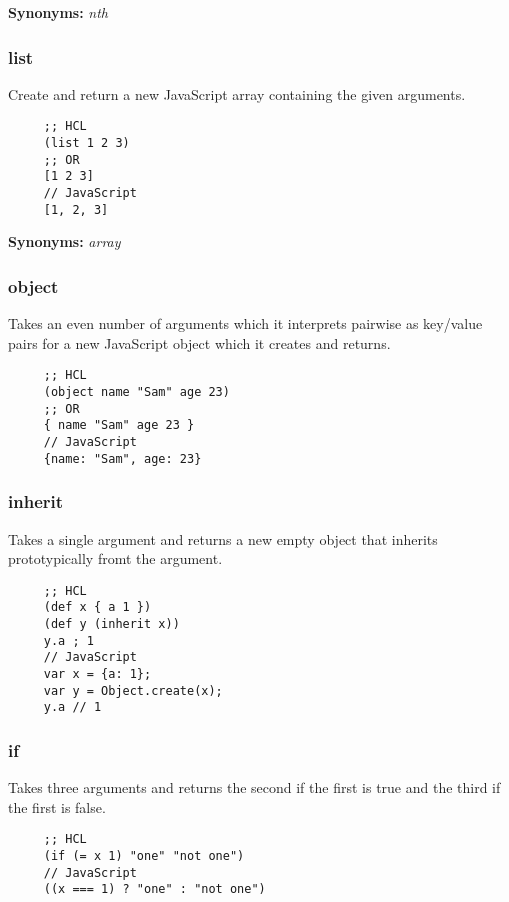 \documentclass[11pt]{article}
\begin{document}
    
    \textbf{Synonyms:} \emph{nth}

\subsubsection{list}
\label{sec-1.3.4}

    Create and return a new JavaScript array containing the given
    arguments.

\begin{verbatim}
     ;; HCL
     (list 1 2 3)
     ;; OR
     [1 2 3]
     // JavaScript
     [1, 2, 3]
\end{verbatim}

    
    \textbf{Synonyms:} \emph{array}

\subsubsection{object}
\label{sec-1.3.5}

    Takes an even number of arguments which it interprets pairwise as
    key/value pairs for a new JavaScript object which it creates and
    returns.

\begin{verbatim}
     ;; HCL
     (object name "Sam" age 23)
     ;; OR
     { name "Sam" age 23 }
     // JavaScript
     {name: "Sam", age: 23}
\end{verbatim}

    
\subsubsection{inherit}
\label{sec-1.3.6}

    Takes a single argument and returns a new empty object that
    inherits prototypically fromt the argument.
    
\begin{verbatim}
     ;; HCL
     (def x { a 1 })
     (def y (inherit x))
     y.a ; 1
     // JavaScript
     var x = {a: 1};
     var y = Object.create(x);
     y.a // 1
\end{verbatim}


\subsubsection{if}
\label{sec-1.3.7}

    Takes three arguments and returns the second if the first is true
    and the third if the first is false.
    
\begin{verbatim}
     ;; HCL
     (if (= x 1) "one" "not one")
     // JavaScript
     ((x === 1) ? "one" : "not one")
\end{verbatim}
\end{document}
